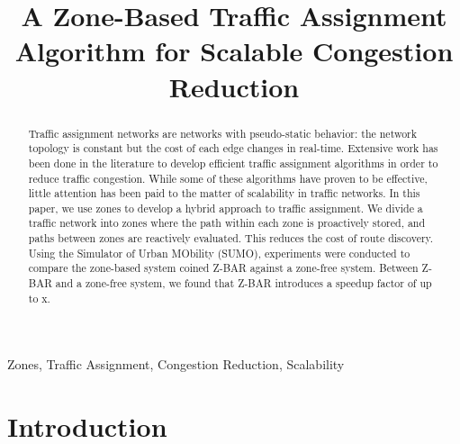 \documentclass[conference]{IEEEtran}
\begin{document}
\raggedbottom

\title{A Zone-Based Traffic Assignment Algorithm for Scalable Congestion Reduction}


\author{
}

\maketitle

\begin{abstract}
Traffic assignment networks are networks with pseudo-static behavior: the network topology is constant but the cost of each edge changes in real-time. Extensive work has been done in the literature to develop efficient traffic assignment algorithms in order to reduce traffic congestion. While some of these algorithms have proven to be effective, little attention has been paid to the matter of scalability in traffic networks. In this paper, we use zones to develop a hybrid approach to traffic assignment. We divide a traffic network into zones where the path within each zone is proactively stored, and paths between zones are reactively evaluated. This reduces the cost of route discovery. Using the Simulator of Urban MObility (SUMO), experiments were conducted to compare the zone-based system coined Z-BAR against a zone-free system. Between Z-BAR and a zone-free system, we found that Z-BAR introduces a speedup factor of up to x.
\end{abstract}

\begin{IEEEkeywords}
Zones, Traffic Assignment, Congestion Reduction, Scalability
\end{IEEEkeywords}

\IEEEpeerreviewmaketitle

\section{Introduction}
\end{document}
